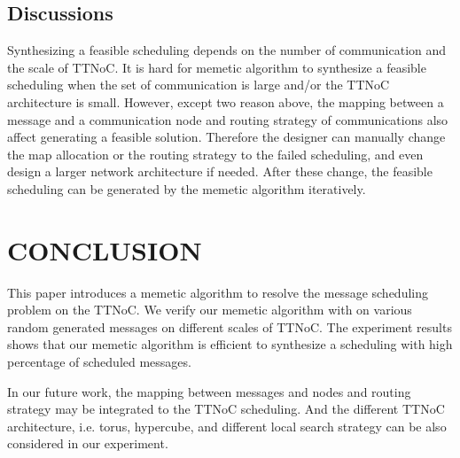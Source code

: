 \documentclass[journal]{IEEEtran}
\begin{document}
\subsection{Discussions}

Synthesizing a feasible scheduling depends on the number of communication and the scale of TTNoC.
It is hard for memetic algorithm to synthesize a feasible scheduling when the set of communication is large and/or the TTNoC architecture is small.
However,
 except two reason above,
  the mapping between a message and a communication node and routing strategy of communications also affect generating a feasible solution.
Therefore the designer can manually change the map allocation or the routing strategy to the failed scheduling,
 and even design a larger network architecture if needed.
After these change,
   the feasible scheduling can be generated by the memetic algorithm iteratively. 

\section{CONCLUSION\label{s:conclud}}

This paper introduces a memetic algorithm to resolve the message scheduling problem on the TTNoC.
We verify our memetic algorithm with on various random generated messages on different scales of TTNoC.
The experiment results shows that our memetic algorithm is efficient to synthesize a scheduling with high percentage of scheduled messages.

In our future work,
the mapping between messages and nodes and routing strategy may be integrated to the TTNoC scheduling.
And the different TTNoC architecture,
i.e. torus, hypercube,
and different local search strategy can be also considered in our experiment.











\end{document}
